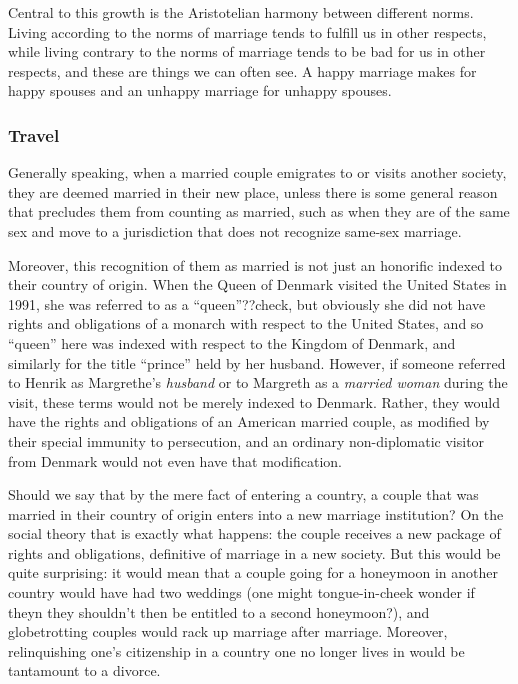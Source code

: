 Central to this growth is the Aristotelian harmony between different norms. Living according to the norms of marriage tends to fulfill us in other respects,
while living contrary to the norms of marriage tends to be bad for us in other respects, and these are things we can often see. A happy marriage makes for
happy spouses and an unhappy marriage for unhappy spouses.

\subsubsection{Travel}
Generally speaking, when a married couple emigrates to or visits another society, they are deemed married in their new place, unless there is some general reason that
precludes them from counting as married, such as when they are of the same sex and move to a jurisdiction that does not recognize same-sex marriage.

Moreover, this recognition of them as married is not just an honorific indexed to their country of origin. When the Queen of Denmark visited the United States in 1991,
she was referred to as a ``queen''??check, but obviously she did not have rights and obligations of a monarch with respect to the United States, and so ``queen''
here was indexed with respect to the Kingdom of Denmark, and similarly for the title ``prince'' held by her husband. However, if someone referred to Henrik 
as Margrethe's \textit{husband} or to Margreth as a \textit{married woman} during the visit, these terms would not be merely indexed to Denmark. Rather, they would
have the rights and obligations of an American married couple, as modified by their special immunity to persecution, and an ordinary non-diplomatic visitor from
Denmark would not even have that modification.

Should we say that by the mere fact of entering a country, a couple that was married in their country of origin enters into a new marriage institution?
On the social theory that is exactly what happens: the couple receives a new package of rights and obligations, definitive of marriage in a new society.
But this would be quite surprising: it would mean that a couple going for a honeymoon in another country would have had two weddings (one might tongue-in-cheek wonder if
theyn they shouldn't then be entitled to a second honeymoon?), and globetrotting couples would rack up marriage after marriage. Moreover, relinquishing one's
citizenship in a country one no longer lives in would be tantamount to a divorce. 

